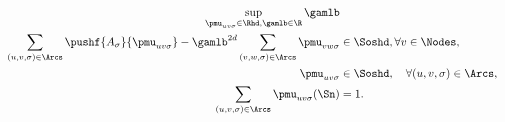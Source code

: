 \begin{myprog}
  \label{prog:dual}
  \begin{align}
    \notag
    \sup_{\pmu_{uv\sigma} \in \Rhd, \gamlb \in \R} \gamlb\\
    \label{eq:dual1}
    \sum_{(u,v,\sigma) \in \Arcs} \pushf{A_\sigma}{\pmu_{uv\sigma}} - \gamlb^{2d} \sum_{(v,w,\sigma) \in \Arcs} \pmu_{vw\sigma} & \in \Soshd, \forall v \in \Nodes,\\
    \label{eq:dual2}
    \pmu_{uv\sigma} & \in \Soshd, \quad \forall (u,v,\sigma) \in \Arcs,\\
    \label{eq:dual3}
    \sum_{(u,v,\sigma) \in \Arcs} \pmu_{uv\sigma}(\Sn) & = 1.
  \end{align}
\end{myprog}
